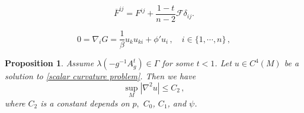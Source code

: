 \documentclass[10pt,a4paper]{amsart}
\newtheorem{proposition}{Proposition}
\begin{document}
\begin{equation}\label{relation}
\overline{F}^{ij}=F^{ij}+\frac{1-t}{n-2}\mathcal{F}\delta_{ij}.
\end{equation}

\begin{equation}\label{vanishes1}
0=\nabla_{i}G=\frac{1}{\beta}u_{k}u_{ki}+ \phi'u_{i}\,, \quad i\in \{1,\cdots,n\}\,,
\end{equation}

\begin{proposition}\label{int hessian estimate}
Assume  $\lambda(-g^{-1}A_{g}^{t})\in \Gamma$ for some $t<1$. Let $u\in C^{4}(M)$ be a solution to  \eqref{scalar curvature problem}. Then we have
\begin{equation*} 
\sup_{M}|\nabla^2u|\leq C_{2}\,,
\end{equation*}
where $C_{2}$ is a constant depends on $p,$  $C_{0}$, $C_{1}$, and  $ \psi$.
\end{proposition}
\end{document}
